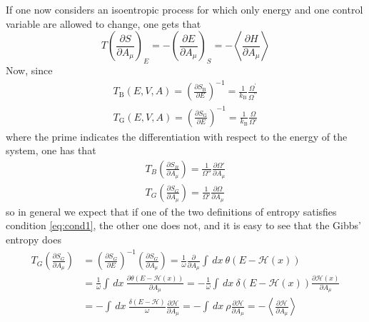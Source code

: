 If one now considers an isoentropic process for which only energy and one control variable are allowed to change, one gets that
\begin{equation}
    T\left(\frac{\partial S}{\partial A_{\mu}}\right)_{E}=-\left(\frac{\partial E}{\partial A_{\mu}}\right)_{S}=-\left\langle\frac{\partial H}{\partial A_{\mu}}\right\rangle
    \label{eq:cond1}
\end{equation}
Now, since
\begin{equation}
    \begin{array}{l}
        T_{\mathrm{B}}(E, V, A)=\left(\frac{\partial S_{\mathrm{B}}}{\partial E}\right)^{-1} = \frac{1}{k_{\mathrm{B}}} \frac{\Omega^{\prime}}{\Omega^{\prime \prime}} \\
        T_{\mathrm{G}}(E, V, A)=\left(\frac{\partial S_{\mathrm{G}}}{\partial E}\right)^{-1}=\frac{1}{k_{\mathrm{B}}} \frac{\Omega}{\Omega'}
        \end{array}
    \label{eq:temperatures_definition}
\end{equation}
where the prime indicates the differentiation with respect to the energy of the system, one has that 
\begin{gather*}
    T_B \left(\frac{\partial S_B}{\partial A_{\mu}}\right) = \frac{1}{\Omega''} \frac{\partial \Omega'}{\partial A_{\mu}} \\
    T_G \left(\frac{\partial S_G}{\partial A_{\mu}}\right) = \frac{1}{\Omega'} \frac{\partial \Omega}{\partial A_{\mu}}
\end{gather*}
so in general we expect that if one of the two definitions of entropy satisfies condition \ref{eq:cond1}, the other one does not, and it is easy to see that the Gibbs' entropy does
\begin{equation*}\begin{aligned}
    T_{G}\left(\frac{\partial S_{G}}{\partial A_{\mu}}\right) &=\left(\frac{\partial S_{G}}{\partial E}\right)^{-1}\left(\frac{\partial S_{G}}{\partial A_{\mu}}\right)=\frac{1}{\omega} \frac{\partial}{\partial A_{\mu}} \int \, dx \ \theta(E-\mathcal{H}(x)) \\
    &=\frac{1}{\omega} \int \, dx \ \frac{\partial \theta(E-\mathcal{H}(x))}{\partial A_{\mu}} = -\frac{1}{\omega} \int \, dx \ \delta(E-\mathcal{H}(x)) \frac{\partial \mathcal{H}(x)}{\partial A_{\mu}} \\
    &=-\int \, dx \ \frac{\delta(E-\mathcal{H})}{\omega} \frac{\partial \mathcal{H}}{\partial A_{\mu}} = -\int \, dx \ \rho \frac{\partial \mathcal{H}}{\partial A_{\mu}} = -\left\langle\frac{\partial \mathcal{H}}{\partial A_{\mu}}\right\rangle
\end{aligned}\end{equation*}
